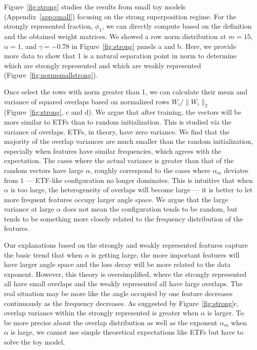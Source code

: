 \documentclass{article}
\begin{document}
Figure~\ref{fig:strong} studies the results from small toy models (Appendix~\ref{app:small}) focusing on the strong superposition regime. For the strongly represented fraction, $\phi_1$, we can directly compute based on the definition and the obtained weight matrices. We showed a row norm distribution at $m = 15$, $\alpha = 1$, and $\gamma = -0.78$ in Figure~\ref{fig:strong} panels a and b. Here, we provide more data to show that 1 is a natural separation point in norm to determine which are strongly represented and which are weakly represented (Figure~\ref{fig:normsmallstrong}).

Once select the rows with norm greater than 1, we can calculate their mean and variance of squared overlaps based on normalized rows $W_i / \| W_i\|_2$ (Figure~\ref{fig:strong}, c and d). We argue that after training, the vectors will be more similar to ETFs than to random initialization. This is studied via the variance of overlaps. ETFs, in theory, have zero variance. We find that the majority of the overlap variances are much smaller than the random initialization, especially when features have similar frequencies, which agrees with the expectation. The cases where the actual variance is greater than that of the random vectors have large $\alpha$, roughly correspond to the cases where $\alpha_m$ deviates from $1$ --- ETF-like configuration no longer dominates. This is intuitive that when $\alpha$ is too large, the heterogeneity of overlaps will become large --- it is better to let more frequent features occupy larger angle space. We argue that the large variance at large $\alpha$ does not mean the configuration tends to be random, but tends to be something more closely related to the frequency distribution of the features.

Our explanations based on the strongly and weakly represented features capture the basic trend that when $\alpha$ is getting large, the more important features will have larger angle space and the loss decay will be more related to the data exponent. However, this theory is oversimplified, where the strongly represented all have small overlaps and the weakly represented all have large overlaps. The real situation may be more like the angle occupied by one feature decreases continuously as the frequency decreases. As suggested by Figure~\ref{fig:strong}c, overlap variance within the strongly represented is greater when $\alpha$ is larger. To be more precise about the overlap distribution as well as the exponent $\alpha_m$ when $\alpha$ is large, we cannot use simple theoretical expectations like ETFs but have to solve the toy model.
\end{document}
